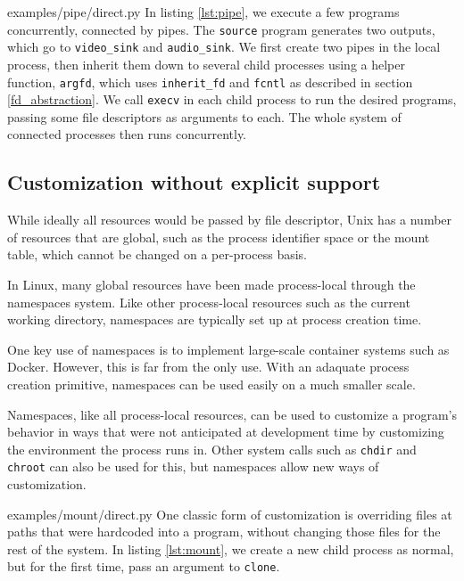 \documentclass[letterpaper,twocolumn,10pt]{article}
\begin{document}

{examples/pipe/direct.py}
In listing \ref{lst:pipe},
we execute a few programs concurrently,
connected by pipes.
The \texttt{source} program generates two outputs, which go to \texttt{video\_sink} and \texttt{audio\_sink}.
We first create two pipes in the local process,
then inherit them down to several child processes using a helper function, \verb|argfd|,
which uses \verb|inherit_fd| and \texttt{fcntl} as described in section \ref{fd_abstraction}.
We call \texttt{execv} in each child process to run the desired programs,
passing some file descriptors as arguments to each.
The whole system of connected processes then runs concurrently.
\subsection{Customization without explicit support}
While ideally all resources would be passed by file descriptor,
Unix has a number of resources that are global,
such as the process identifier space or the mount table,
which cannot be changed on a per-process basis\cite{capsicum}.

In Linux, many global resources have been made process-local
through the namespaces system\cite{lwn_namespaces}.
Like other process-local resources such as the current working directory,
namespaces are typically set up at process creation time.

One key use of namespaces is to implement large-scale container systems such as Docker\cite{lwn_namespaces}.
However, this is far from the only use.
With an adaquate process creation primitive,
namespaces can be used easily on a much smaller scale.

Namespaces, like all process-local resources,
can be used to customize a program's behavior
in ways that were not anticipated at development time
by customizing the environment the process runs in\cite{plan9ns}.
Other system calls such as \texttt{chdir} and \texttt{chroot} can also be used for this,
but namespaces allow new ways of customization\cite{mount_namespaces}.


{examples/mount/direct.py}
One classic form of customization
is overriding files at paths that were hardcoded into a program,
without changing those files for the rest of the system.
In listing \ref{lst:mount},
we create a new child process as normal,
but for the first time,
pass an argument to \texttt{clone}.
\end{document}
